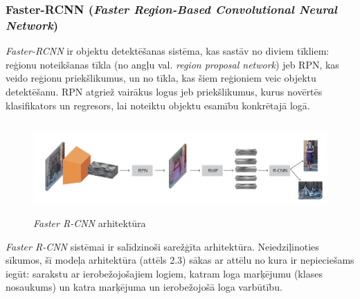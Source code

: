 \subsubsection{Faster-RCNN (\textit{Faster Region-Based Convolutional Neural Network})}
\textit{Faster-RCNN} ir objektu detektēšanas sistēma, kas sastāv no diviem tīkliem: reģionu noteikšanas tīkla (no angļu val. \textit{region proposal network}) jeb RPN, kas veido reģionu priekšlikumus, un no tīkla, kas šiem reģioniem veic objektu detektēšanu. RPN atgriež vairākus logus jeb priekšlikumus, kurus novērtēs klasifikators un regresors, lai noteiktu objektu esamību konkrētajā logā.

\begin{figure}[h]%
	\centering
	\includegraphics[height=3.5cm]{images/fastercnnarch.png} %
	\caption{\textit{Faster R-CNN} arhitektūra \cite{fasterrcnn}}%
	\label{fig:example}%
\end{figure}
\textit{Faster R-CNN} sistēmai ir salīdzinoši sarežģīta arhitektūra. Neiedziļinoties sīkumos, šī modeļa arhitektūra (attēls 2.3) sākas ar attēlu no kura ir nepieciešams iegūt: sarakstu ar ierobežojošajiem logiem, katram loga marķējumu (klases nosaukums) un katra marķējuma un ierobežojošā loga varbūtību. 

